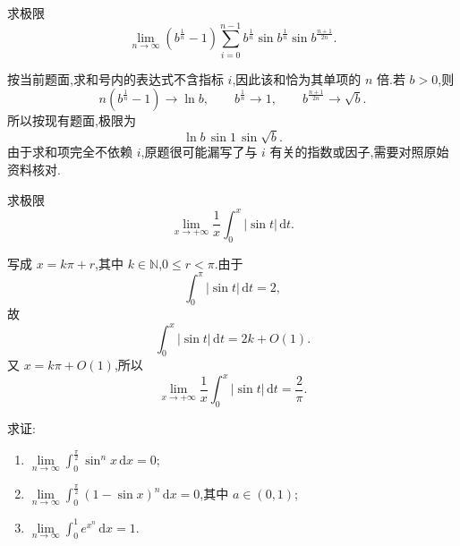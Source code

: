 \begin{example}
    求极限
    \[
        \displaystyle\lim\limits_{n\to\infty}
        \left(b^{\frac{1}{n}}-1\right)
        \sum\limits_{i=0}^{n-1}
        b^{\frac{1}{n}}\sin b^{\frac{1}{n}}
        \sin b^{\frac{n+1}{2n}}.
    \]
\end{example}
\exampleblank

\begin{solution}
    按当前题面,求和号内的表达式不含指标 $i$,因此该和恰为其单项的 $n$ 倍.若 $b>0$,则
    \[
        n\left(b^{\frac{1}{n}}-1\right)\longrightarrow\ln b,
        \qquad
        b^{\frac{1}{n}}\longrightarrow1,
        \qquad
        b^{\frac{n+1}{2n}}\longrightarrow\sqrt b.
    \]
    所以按现有题面,极限为
    \[
        \boxed{\ln b\,\sin1\,\sin\sqrt b}.
    \]
    由于求和项完全不依赖 $i$,原题很可能漏写了与 $i$ 有关的指数或因子,需要对照原始资料核对.
\end{solution}

\begin{example}
    求极限
    \[
        \displaystyle\lim\limits_{x\to+\infty}\dfrac{1}{x}\int_0^x|\sin t|\,\mathrm{d}t.
    \]
\end{example}
\exampleblank

\begin{solution}
    写成 $x=k\pi+r$,其中 $k\in\mathbb{N}$,$0\leq r<\pi$.由于
    \[
        \displaystyle\int_0^\pi|\sin t|\,\mathrm{d}t=2,
    \]
    故
    \[
        \displaystyle\int_0^x|\sin t|\,\mathrm{d}t=2k+O(1).
    \]
    又 $x=k\pi+O(1)$,所以
    \[
        \displaystyle\lim\limits_{x\to+\infty}\dfrac{1}{x}
        \int_0^x|\sin t|\,\mathrm{d}t
        =\boxed{\dfrac{2}{\pi}}.
    \]
\end{solution}

\begin{example}
    求证:
    \begin{enumerate}
        \item $\displaystyle\lim\limits_{n\to\infty}\int_0^{\frac{\pi}{2}}\sin^n x\,\mathrm{d}x=0$;
        \item $\displaystyle\lim\limits_{n\to\infty}\int_0^{\frac{\pi}{2}}(1-\sin x)^n\,\mathrm{d}x=0$,其中 $a\in(0,1)$;
        \item $\displaystyle\lim\limits_{n\to\infty}\int_0^1e^{x^n}\,\mathrm{d}x=1$.
    \end{enumerate}
\end{example}
\exampleblank

